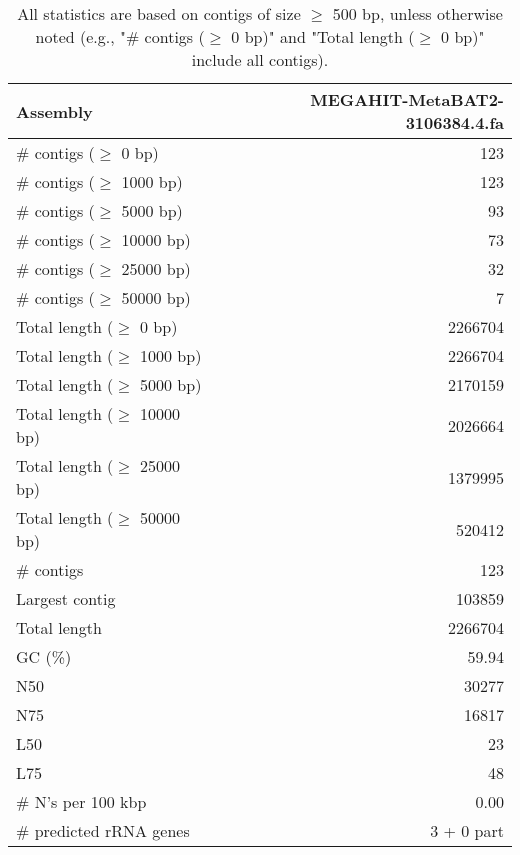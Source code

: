 \documentclass[12pt,a4paper]{article}
\begin{document}
\begin{table}[ht]
\begin{center}
\caption{All statistics are based on contigs of size $\geq$ 500 bp, unless otherwise noted (e.g., "\# contigs ($\geq$ 0 bp)" and "Total length ($\geq$ 0 bp)" include all contigs).}
\begin{tabular}{|l*{1}{|r}|}
\hline
Assembly & MEGAHIT-MetaBAT2-3106384.4.fa \\ \hline
\# contigs ($\geq$ 0 bp) & 123 \\ \hline
\# contigs ($\geq$ 1000 bp) & 123 \\ \hline
\# contigs ($\geq$ 5000 bp) & 93 \\ \hline
\# contigs ($\geq$ 10000 bp) & 73 \\ \hline
\# contigs ($\geq$ 25000 bp) & 32 \\ \hline
\# contigs ($\geq$ 50000 bp) & 7 \\ \hline
Total length ($\geq$ 0 bp) & 2266704 \\ \hline
Total length ($\geq$ 1000 bp) & 2266704 \\ \hline
Total length ($\geq$ 5000 bp) & 2170159 \\ \hline
Total length ($\geq$ 10000 bp) & 2026664 \\ \hline
Total length ($\geq$ 25000 bp) & 1379995 \\ \hline
Total length ($\geq$ 50000 bp) & 520412 \\ \hline
\# contigs & 123 \\ \hline
Largest contig & 103859 \\ \hline
Total length & 2266704 \\ \hline
GC (\%) & 59.94 \\ \hline
N50 & 30277 \\ \hline
N75 & 16817 \\ \hline
L50 & 23 \\ \hline
L75 & 48 \\ \hline
\# N's per 100 kbp & 0.00 \\ \hline
\# predicted rRNA genes & 3 + 0 part \\ \hline
\end{tabular}
\end{center}
\end{table}
\end{document}
